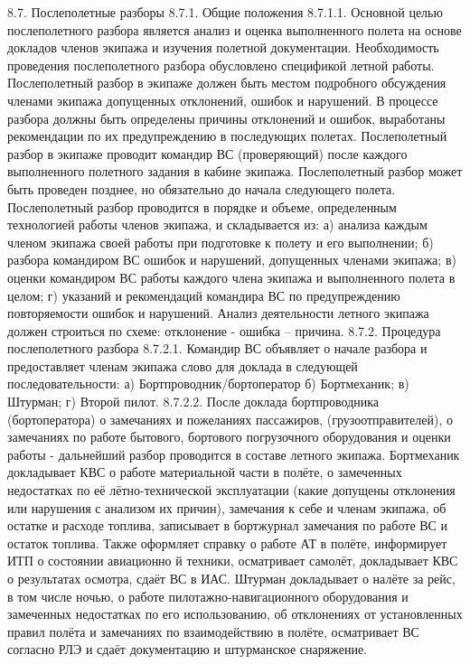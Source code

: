 8.7. Послеполетные разборы
8.7.1. Общие положения
8.7.1.1. Основной целью послеполетного разбора является анализ и оценка выполненного полета на основе докладов членов экипажа и изучения полетной документации. 
Необходимость проведения послеполетного разбора обусловлено спецификой летной работы. 
Послеполетный разбор в экипаже должен быть местом подробного обсуждения членами экипажа допущенных отклонений, ошибок и нарушений. В процессе разбора должны быть определены причины отклонений и ошибок, выработаны рекомендации по их предупреждению в последующих полетах. 
Послеполетный разбор в экипаже проводит командир ВС (проверяющий) после каждого выполненного полетного задания в кабине экипажа. Послеполетный разбор может быть проведен позднее, но обязательно до начала следующего полета. 
Послеполетный разбор проводится в порядке и объеме, определенным технологией работы членов экипажа, и складывается из: 
а)	анализа каждым членом экипажа своей работы при подготовке к полету и его выполнении;
б)	разбора командиром ВС ошибок и нарушений, допущенных членами экипажа;
в)	оценки командиром ВС работы каждого члена экипажа и выполненного полета в целом;
г)	указаний и рекомендаций командира ВС по предупреждению повторяемости ошибок и нарушений.
Анализ деятельности летного экипажа должен строиться по схеме: отклонение - ошибка – причина.
8.7.2. Процедура послеполетного разбора
8.7.2.1. Командир ВС объявляет о начале разбора и предоставляет членам экипажа слово для доклада в следующей последовательности:
а)	Бортпроводник/бортоператор
б)	Бортмеханик;
в)	Штурман;
г)	Второй пилот.
8.7.2.2. После доклада бортпроводника (бортоператора) о замечаниях и пожеланиях пассажиров, (грузоотправителей), о замечаниях по работе бытового, бортового погрузочного оборудования и оценки работы - дальнейший разбор проводится в составе летного экипажа.
Бортмеханик докладывает КВС о работе материальной части в полёте, о замеченных недостатках по её лётно-технической эксплуатации (какие допущены отклонения или нарушения с анализом их причин), замечания к себе и членам экипажа, об остатке и расходе топлива, записывает в бортжурнал замечания по работе ВС и остаток топлива. Также оформляет справку о работе АТ в полёте, информирует ИТП о состоянии авиационно й техники, осматривает самолёт, докладывает КВС о результатах осмотра, сдаёт ВС в ИАС. Штурман докладывает о налёте за рейс, в том числе ночью, о работе пилотажно-навигационного оборудования и замеченных недостатках по его использованию, об отклонениях от установленных правил полёта и замечаниях по взаимодействию в полёте, осматривает ВС согласно РЛЭ и сдаёт документацию и штурманское снаряжение.
